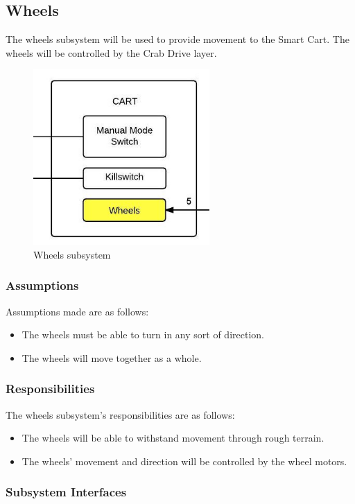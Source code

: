 \subsection{Wheels}
The wheels subsystem will be used to provide movement to the Smart Cart. The wheels will be controlled by the Crab Drive layer.

\begin{figure}[h!]
	\centering
 	\includegraphics[width=0.60\textwidth]{images/cart_wheel}
 \caption{Wheels subsystem}
\end{figure}

\subsubsection{Assumptions}
Assumptions made are as follows:
\begin{itemize}
	\item The wheels must be able to turn in any sort of direction.
	\item The wheels will move together as a whole.
\end{itemize}

\subsubsection{Responsibilities}
The wheels subsystem's responsibilities are as follows:
\begin{itemize}
	\item The wheels will be able to withstand movement through rough terrain.
	\item The wheels' movement and direction will be controlled by the wheel motors.
\end{itemize}

\subsubsection{Subsystem Interfaces}

